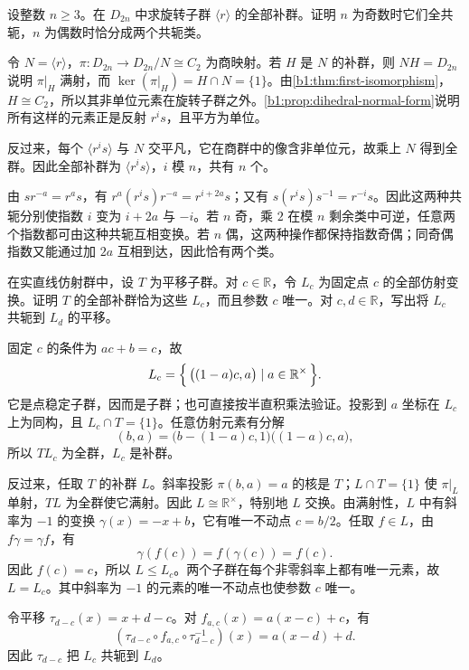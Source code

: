 \begin{exercise}\label{b1:ex:06-4}
	设整数 \(n\geq3\)。在 \(D_{2n}\) 中求旋转子群 \(\langle r\rangle\) 的全部补群。证明 \(n\) 为奇数时它们全共轭，\(n\) 为偶数时恰分成两个共轭类。
\end{exercise}
\begin{solution}
	令 \(N=\langle r\rangle\)，\(\pi:D_{2n}\rightarrow D_{2n}/N\cong C_2\) 为商映射。若 \(H\) 是 \(N\) 的补群，则 \(NH=D_{2n}\) 说明 \(\pi|_H\) 满射，而 \(\ker(\pi|_H)=H\cap N=\{1\}\)。由\cref{b1:thm:first-isomorphism}，\(H\cong C_2\)，所以其非单位元素在旋转子群之外。\cref{b1:prop:dihedral-normal-form}说明所有这样的元素正是反射 \(r^is\)，且平方为单位。

	反过来，每个 \(\langle r^is\rangle\) 与 \(N\) 交平凡，它在商群中的像含非单位元，故乘上 \(N\) 得到全群。因此全部补群为 \(\langle r^is\rangle\)，\(i\) 模 \(n\)，共有 \(n\) 个。

	由 \(sr^{-a}=r^as\)，有 \(r^a(r^is)r^{-a}=r^{i+2a}s\)；又有 \(s(r^is)s^{-1}=r^{-i}s\)。因此这两种共轭分别使指数 \(i\) 变为 \(i+2a\) 与 \(-i\)。若 \(n\) 奇，乘 \(2\) 在模 \(n\) 剩余类中可逆，任意两个指数都可由这种共轭互相变换。若 \(n\) 偶，这两种操作都保持指数奇偶；同奇偶指数又能通过加 \(2a\) 互相到达，因此恰有两个类。
\end{solution}

\begin{exercise}\label{b1:ex:06-5}
	在实直线仿射群中，设 \(T\) 为平移子群。对 \(c\in\mathbb R\)，令 \(L_c\) 为固定点 \(c\) 的全部仿射变换。证明 \(T\) 的全部补群恰为这些 \(L_c\)，而且参数 \(c\) 唯一。对 \(c,d\in\mathbb R\)，写出将 \(L_c\) 共轭到 \(L_d\) 的平移。
\end{exercise}
\begin{solution}
	固定 \(c\) 的条件为 \(ac+b=c\)，故
	\[
		L_c=\Bigl\{\,\bigl((1-a)c,a\bigr)\mid a\in\mathbb R^\times\,\Bigr\}.
	\]
	它是点稳定子群，因而是子群；也可直接按半直积乘法验证。投影到 \(a\) 坐标在 \(L_c\) 上为同构，且 \(L_c\cap T=\{1\}\)。任意仿射元素有分解
	\[
		(b,a)=\bigl(b-(1-a)c,1\bigr)\bigl((1-a)c,a\bigr),
	\]
	所以 \(TL_c\) 为全群，\(L_c\) 是补群。

	反过来，任取 \(T\) 的补群 \(L\)。斜率投影 \(\pi(b,a)=a\) 的核是 \(T\)；\(L\cap T=\{1\}\) 使 \(\pi|_L\) 单射，\(TL\) 为全群使它满射。因此 \(L\cong\mathbb R^\times\)，特别地 \(L\) 交换。由满射性，\(L\) 中有斜率为 \(-1\) 的变换 \(\gamma(x)=-x+b\)，它有唯一不动点 \(c=b/2\)。任取 \(f\in L\)，由 \(f\gamma=\gamma f\)，有
	\[
		\gamma(f(c))=f(\gamma(c))=f(c).
	\]
	因此 \(f(c)=c\)，所以 \(L\leq L_c\)。两个子群在每个非零斜率上都有唯一元素，故 \(L=L_c\)。其中斜率为 \(-1\) 的元素的唯一不动点也使参数 \(c\) 唯一。

	令平移 \(\tau_{d-c}(x)=x+d-c\)。对 \(f_{a,c}(x)=a(x-c)+c\)，有
	\[
		(\tau_{d-c}\circ f_{a,c}\circ\tau_{d-c}^{-1})(x)=a(x-d)+d.
	\]
	因此 \(\tau_{d-c}\) 把 \(L_c\) 共轭到 \(L_d\)。
\end{solution}

